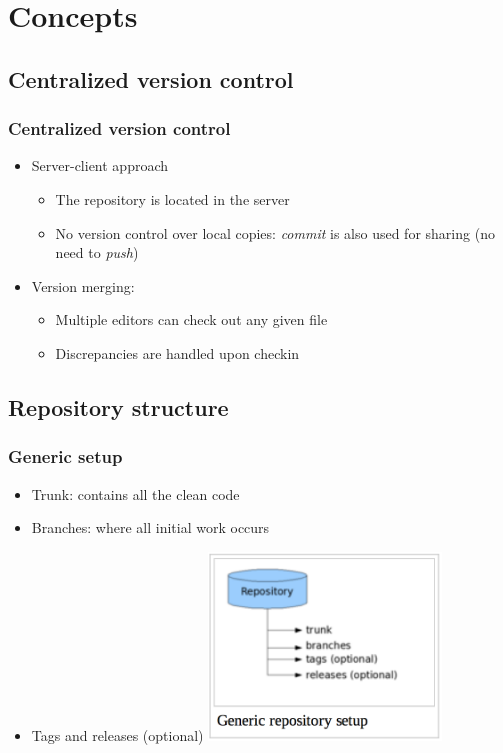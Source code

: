 \documentclass{beamer}
\begin{document}
\section{Concepts}
\frame{\tableofcontents[currentsection]}

\subsection{Centralized version control}


\frame
{
  \frametitle{Centralized version control}
  
  \begin{itemize}
  \item<1-> Server-client approach
  	\begin{itemize}
	\item<1-> The repository is located in the server
	\item<2-> No version control over local copies: \textit{commit} is also used for sharing (no need to \textit{push})
	\end{itemize}
  \item<3-> Version merging:
  	\begin{itemize}
  	\item<3-> Multiple editors can check out any given file
	\item<3-> Discrepancies are handled upon checkin
	\end{itemize}
  \end{itemize}
  
}

\subsection{Repository structure}

\frame
{
  \frametitle{Generic setup}
  
  \begin{itemize}
  \item<1-> Trunk: contains all the clean code
  \item<1-> Branches: where all initial work occurs
  \item<1-> Tags and releases (optional)
  \includegraphics[height=5cm]{repo_structure.png}
  \end{itemize}

}
\end{document}
